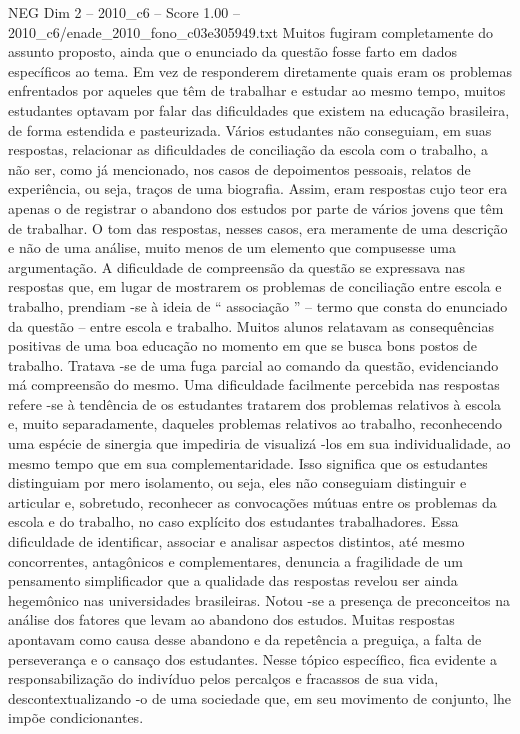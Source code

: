 \begin{textsample}{NEG Dim 2 – 2010\_c6 – Score 1.00 – 2010\_c6/enade\_2010\_fono\_c03e305949.txt}
Muitos fugiram completamente do assunto proposto, ainda que o enunciado da questão fosse farto em dados específicos ao tema.
Em vez de responderem diretamente quais eram os problemas enfrentados por aqueles que têm de trabalhar e estudar ao mesmo tempo, muitos estudantes optavam por falar das dificuldades que existem na educação brasileira, de forma estendida e pasteurizada.
Vários estudantes não conseguiam, em suas respostas, relacionar as dificuldades de conciliação da escola com o trabalho, a não ser, como já mencionado, nos casos de depoimentos pessoais, relatos de experiência, ou seja, traços de uma biografia.
Assim, eram respostas cujo teor era apenas o de registrar o abandono dos estudos por parte de vários jovens que têm de trabalhar.
O tom das respostas, nesses casos, era meramente de uma descrição e não de uma análise, muito menos de um elemento que compusesse uma argumentação.
A dificuldade de compreensão da questão se expressava nas respostas que, em lugar de mostrarem os problemas de conciliação entre escola e trabalho, prendiam -se à ideia de “ associação ” – termo que consta do enunciado da questão – entre escola e trabalho.
Muitos alunos relatavam as consequências positivas de uma boa educação no momento em que se busca bons postos de trabalho.
Tratava -se de uma fuga parcial ao comando da questão, evidenciando má compreensão do mesmo.
Uma dificuldade facilmente percebida nas respostas refere -se à tendência de os estudantes tratarem dos problemas relativos à escola e, muito separadamente, daqueles problemas relativos ao trabalho, reconhecendo uma espécie de sinergia que impediria de visualizá -los em sua individualidade, ao mesmo tempo que em sua complementaridade.
Isso significa que os estudantes distinguiam por mero isolamento, ou seja, eles não conseguiam distinguir e articular e, sobretudo, reconhecer as convocações mútuas entre os problemas da escola e do trabalho, no caso explícito dos estudantes trabalhadores.
Essa dificuldade de identificar, associar e analisar aspectos distintos, até mesmo concorrentes, antagônicos e complementares, denuncia a fragilidade de um pensamento simplificador que a qualidade das respostas revelou ser ainda hegemônico nas universidades brasileiras.
Notou -se a presença de preconceitos na análise dos fatores que levam ao abandono dos estudos.
Muitas respostas apontavam como causa desse abandono e da repetência a preguiça, a falta de perseverança e o cansaço dos estudantes.
Nesse tópico específico, fica evidente a responsabilização do indivíduo pelos percalços e fracassos de sua vida, descontextualizando -o de uma sociedade que, em seu movimento de conjunto, lhe impõe condicionantes.

\end{textsample}
